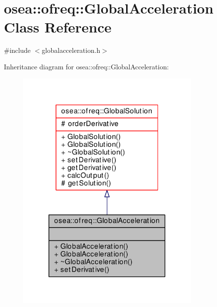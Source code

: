 \hypertarget{classosea_1_1ofreq_1_1_global_acceleration}{\section{osea\-:\-:ofreq\-:\-:Global\-Acceleration Class Reference}
\label{classosea_1_1ofreq_1_1_global_acceleration}
}


{\ttfamily \#include $<$globalacceleration.\-h$>$}



Inheritance diagram for osea\-:\-:ofreq\-:\-:Global\-Acceleration\-:\nopagebreak
\begin{figure}[H]
\begin{center}
\leavevmode
\includegraphics[width=260pt]{classosea_1_1ofreq_1_1_global_acceleration__inherit__graph}
\end{center}
\end{figure}
